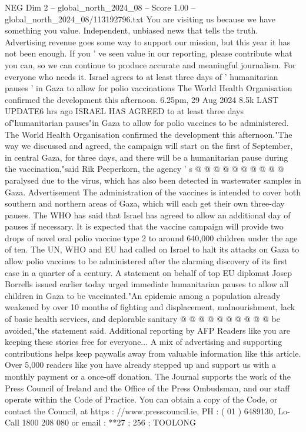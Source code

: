 \begin{textsample}{NEG Dim 2 – global\_north\_2024\_08 – Score 1.00 – global\_north\_2024\_08/113192796.txt}  \label{ex:f2_neg_362}
You are visiting us because we have something you value.
Independent, unbiased news that tells the truth.
Advertising revenue goes some way to support our mission, but this year it has not been enough.
If you ' ve seen value in our reporting, please contribute what you can, so we can continue to produce accurate and meaningful journalism.
For everyone who needs it.
Israel agrees to at least three days of ' humanitarian pauses ' in Gaza to allow for polio vaccinations The World Health Organisation confirmed the development this afternoon. 6.25pm, 29 Aug 2024 8.5k LAST UPDATE6 hrs ago ISRAEL HAS AGREED to at least three days of"humanitarian pauses"in Gaza to allow for polio vaccines to be administered.
The World Health Organisation confirmed the development this afternoon."The way we discussed and agreed, the campaign will start on the first of September, in central Gaza, for three days, and there will be a humanitarian pause during the vaccination,"said Rik Peeperkorn, the agency ' s @ @ @ @ @ @ @ @ @ @ paralysed due to the virus, which has also been detected in wastewater samples in Gaza.
Advertisement The administration of the vaccines is intended to cover both southern and northern areas of Gaza, which will each get their own three-day pauses.
The WHO has said that Israel has agreed to allow an additional day of pauses if necessary.
It is expected that the vaccine campaign will provide two drops of novel oral polio vaccine type 2 to around 640,000 children under the age of ten.
The UN, WHO and EU had called on Israel to halt its attacks on Gaza to allow polio vaccines to be administered after the alarming discovery of its first case in a quarter of a century.
A statement on behalf of top EU diplomat Josep Borrells issued earlier today urged immediate humanitarian pauses to allow all children in Gaza to be vaccinated."An epidemic among a population already weakened by over 10 months of fighting and displacement, malnourishment, lack of basic health services, and deplorable sanitary @ @ @ @ @ @ @ @ @ @ be avoided,"the statement said.
Additional reporting by AFP Readers like you are keeping these stories free for everyone...
A mix of advertising and supporting contributions helps keep paywalls away from valuable information like this article.
Over 5,000 readers like you have already stepped up and support us with a monthly payment or a once-off donation.
The Journal supports the work of the Press Council of Ireland and the Office of the Press Ombudsman, and our staff operate within the Code of Practice.
You can obtain a copy of the Code, or contact the Council, at https : //www.presscouncil.ie, PH : ( 01 ) 6489130, Lo-Call 1800 208 080 or email : **27 ; 256 ; TOOLONG

\end{textsample}
